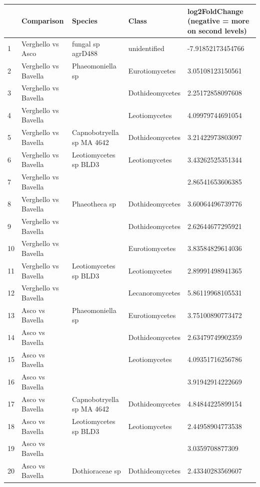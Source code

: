 \documentclass[12pt]{article}\usepackage[]{graphicx}\usepackage[]{color}
\numberwithin{figure}{section}
\begin{document}
\begin{table}[ht]
\centering
\begingroup\tiny
\begin{tabular}{lllll}
  \hline
 & Comparison & Species & Class & log2FoldChange 
 (negative = more on second levels) \\ 
  \hline
1 & Verghello vs Asco & fungal sp agrD488 & unidentified & -7.91852173454766 \\ 
  2 & Verghello vs Bavella & Phaeomoniella sp & Eurotiomycetes & 3.05108123150561 \\ 
  3 & Verghello vs Bavella &  & Dothideomycetes & 2.25172858097608 \\ 
  4 & Verghello vs Bavella &  & Leotiomycetes & 4.09979744691054 \\ 
  5 & Verghello vs Bavella & Capnobotryella sp MA 4642 & Dothideomycetes & 3.21422973803097 \\ 
  6 & Verghello vs Bavella & Leotiomycetes sp BLD3 & Leotiomycetes & 3.43262525351344 \\ 
  7 & Verghello vs Bavella &  &  & 2.86541653606385 \\ 
  8 & Verghello vs Bavella & Phaeotheca sp & Dothideomycetes & 3.60064496739776 \\ 
  9 & Verghello vs Bavella &  & Dothideomycetes & 2.62644677295921 \\ 
  10 & Verghello vs Bavella &  & Eurotiomycetes & 3.83584829614036 \\ 
  11 & Verghello vs Bavella & Leotiomycetes sp BLD3 & Leotiomycetes & 2.89991498941365 \\ 
  12 & Verghello vs Bavella &  & Lecanoromycetes & 5.86119968105531 \\ 
  13 & Asco vs Bavella & Phaeomoniella sp & Eurotiomycetes & 3.75100890773472 \\ 
  14 & Asco vs Bavella &  & Dothideomycetes & 2.63479749902359 \\ 
  15 & Asco vs Bavella &  & Leotiomycetes & 4.09351716256786 \\ 
  16 & Asco vs Bavella &  &  & 3.91942914222669 \\ 
  17 & Asco vs Bavella & Capnobotryella sp MA 4642 & Dothideomycetes & 4.84844225899154 \\ 
  18 & Asco vs Bavella & Leotiomycetes sp BLD3 & Leotiomycetes & 2.44958904773538 \\ 
  19 & Asco vs Bavella &  &  & 3.0359708877309 \\ 
  20 & Asco vs Bavella & Dothioraceae sp & Dothideomycetes & 2.43340283569607 \\ 

\end{tabular}
\end{table}
\end{document}
